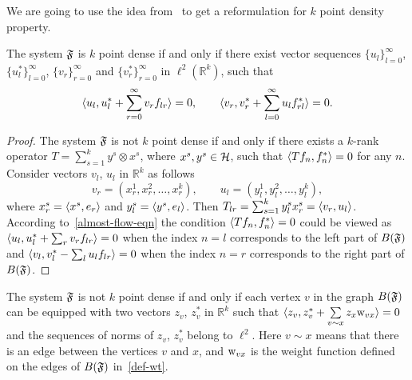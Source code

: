 \documentclass[12pt,oneside,a4paper]{amsart}
\begin{document}
      We are going to use the idea from~\cite{me} to get a reformulation for $k$ point density property.
      \begin{prop}
        \label{prop-vec-est}
        The system $\fsys$ is $k$ point dense if and only if there exist vector sequences $\{u_l\}_{l=0}^\infty$, $\{u^*_l\}_{l=0}^\infty$,
          $\{v_r\}_{r=0}^\infty$ and $\{v^*_r\}_{r=0}^\infty$ in $\ell^2 (\mathbb{R}^k)$, such that
        \begin{equation}
          \label{prop-vec-eqn}
          \inner{u_l}{u^*_l + \sum_{r=0}^\infty v_r f_{lr}} = 0, \quad \quad
          \inner{v_r}{v^*_r + \sum_{l=0}^\infty u_l f_{rl}^*} = 0.
        \end{equation}
      \end{prop}
      \begin{proof}
        The system $\fsys$ is not $k$ point dense if and only if there exists a $k$-rank operator $T = \sum_{s=1}^k y^s \otimes x^s$, where
          $x^s, y^s \in \cal{H}$, such that $\inner{Tf_n}{f_n^*} = 0$ for any $n$.
        Consider vectors $v_l$, $u_l$ in $\mathbb{R}^k$ as follows
        \begin{equation*}
          v_r = (x^1_r, x^2_r, \dots, x^k_r),\qquad
          u_l = (y^1_l, y^2_l, \dots, y^k_l),
        \end{equation*}
          where $x^s_r = \inner{x^s}{e_r}$ and $y^s_l = \inner{y^s}{e_l}$.
        Then $T_{lr} = \sum_{s=1}^k y^s_l x^s_r = \inner{v_r}{u_l}$.
        According to~\eqref{almost-flow-eqn} the condition $\inner{Tf_n}{f^*_n} = 0$ could be viewed as
          $\inner{u_l}{u^*_l + \sum_r v_r f_{lr}} = 0$
        when the index $n=l$ corresponds to the left part of $B(\fsys)$ and
          $\inner{v_l}{v^*_l - \sum_l u_l f_{lr}} = 0$
        when the index $n=r$ corresponds to the right part of $B(\fsys)$.
      \end{proof}
      \begin{corol}
        \label{corol:kpd}
        The system $\fsys$ is not $k$ point dense if and only if each vertex $v$ in the graph $B(\fsys)$ can be
          equipped with two vectors $z_v$, $z_v^*$ in $\mathbb{R}^k$ such that
          $\inner{z_v}{z_v^* + \sum\limits_{v \sim x} z_x \wt_{vx}} = 0$ and
          the sequences of norms of $z_v$, $z_v^*$ belong to $\ell^2$.
          Here $v \sim x$ means that there is an edge between the vertices $v$ and $x$, and
          $\wt_{vx}$ is the weight function defined on the edges of $B(\fsys)$ in~\eqref{def-wt}.
      \end{corol}
\end{document}
